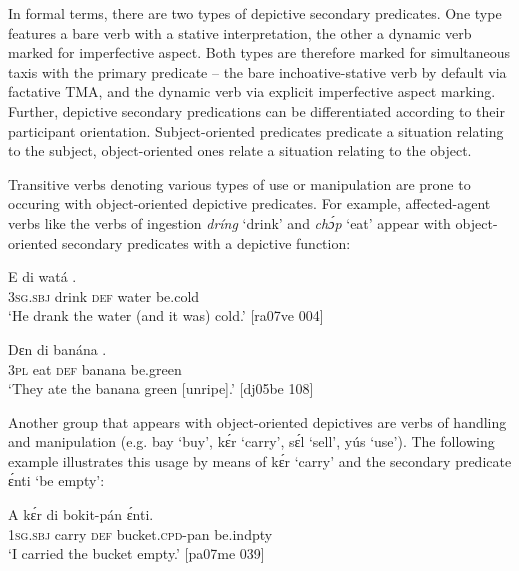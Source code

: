 In formal terms, there are two types of depictive secondary predicates. One type features a bare verb with a stative interpretation, the other a dynamic verb marked for imperfective aspect. Both types are therefore marked for simultaneous taxis with the primary predicate – the bare inchoative-stative verb by default via factative TMA, and the dynamic verb via explicit imperfective aspect marking. Further, depictive secondary predications can be differentiated according to their participant orientation. Subject-oriented predicates predicate a situation relating to the subject, object-oriented ones relate a situation relating to the object. 


Transitive verbs denoting various types of use or manipulation are prone to occuring with object-oriented depictive predicates. For example, affected-agent verbs\index{} like the verbs of ingestion \textit{dríng} ‘drink’ and \textit{chɔ́p} ‘eat’ appear with object-oriented secondary predicates with a depictive function:



\ea%
    \label{ex:key:1591}
    \gll E      di  watá  .\\
\textsc{3sg.sbj}  drink  \textsc{def}  water  be.cold\\

\glt ‘He drank the water (and it was) cold.’ [ra07ve 004]
\z


\ea%
    \label{ex:key:1592}
    \gll Dɛn    di  banána  .\\
\textsc{3pl}  eat    \textsc{def}  banana  be.green\\

\glt ‘They ate the banana green [unripe].’ [dj05be 108]
\z

Another group that appears with object-oriented depictives are verbs of handling and manipulation (e.g. bay ‘buy’, kɛ́r ‘carry’, sɛ́l ‘sell’, yús ‘use’). The following example illustrates this usage by means of kɛ́r ‘carry’ and the secondary predicate ɛ́nti ‘be empty’:


\ea%
    \label{ex:key:1593}
    \gll A    kɛ́r    di  bokit-pán    ɛ́nti.\\
\textsc{1sg.sbj}  carry  \textsc{def}  bucket.\textsc{cpd}{}-pan  be.indpty\\

\glt ‘I carried the bucket empty.’ [pa07me 039]
\z

